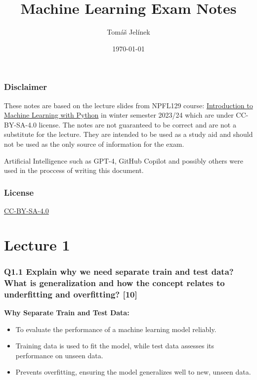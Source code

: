 \documentclass[11pt]{article}
\title{Machine Learning Exam Notes}
\author{Tomáš Jelínek}
\date{\today}
\begin{document}
\maketitle

\setcounter{secnumdepth}{0}

\titleformat{\section}[block]{\Large\bfseries}{\thesection}{1em}{}
\titleformat{\subsection}[block]{\large\bfseries}{\thesubsection}{1em}{}

\tableofcontents

\newpage

\section{Disclaimer}
These notes are based on the lecture slides from NPFL129 course: \href{https://ufal.mff.cuni.cz/courses/npfl129/2324-winter#home}{Introduction to Machine Learning with Python} in winter semester 2023/24 which are under CC-BY-SA-4.0 license. The notes are not guaranteed to be correct and are not a substitute for the lecture. They are intended to be used as a study aid and should not be used as the only source of information for the exam.

Artificial Intelligence such as GPT-4, GitHub Copilot and possibly others were used in the proccess of writing this document.

\section{License}
\href{https://creativecommons.org/licenses/by-sa/4.0/}{CC-BY-SA-4.0}

\part{Lecture 1}
\section{Q1.1 Explain why we need separate train and test data? What is generalization and how the concept relates to underfitting and overfitting? [10]}

\textbf{Why Separate Train and Test Data:}
\begin{itemize}
    \item To evaluate the performance of a machine learning model reliably.
    \item Training data is used to fit the model, while test data assesses its performance on unseen data.
    \item Prevents overfitting, ensuring the model generalizes well to new, unseen data.
\end{itemize}
\end{document}
